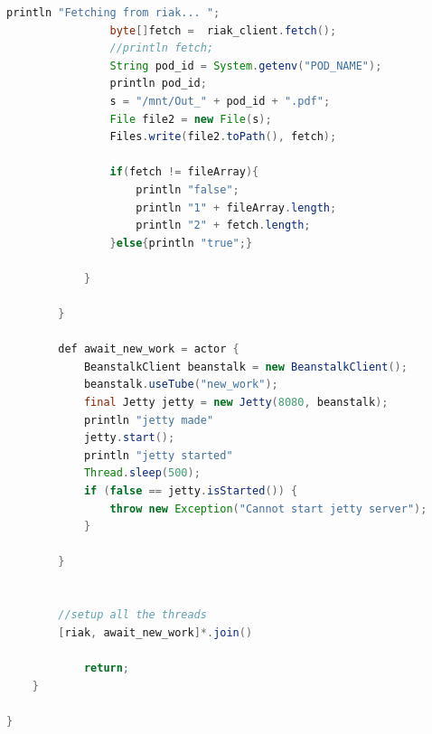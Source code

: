 \documentclass[onecolumn, draftclsnofoot,10pt, compsoc]{IEEEtran}
\begin{document}
\begin{appendices}
\begin{lstlisting}[language = java]
				println "Fetching from riak... ";
				byte[]fetch =  riak_client.fetch();
				//println fetch;
				String pod_id = System.getenv("POD_NAME");
				println pod_id;
				s = "/mnt/Out_" + pod_id + ".pdf";
				File file2 = new File(s);
				Files.write(file2.toPath(), fetch);

				if(fetch != fileArray){
					println "false";
					println "1" + fileArray.length;
					println "2" + fetch.length;
				}else{println "true";}
				
			}

		}

		def await_new_work = actor {
			BeanstalkClient beanstalk = new BeanstalkClient();		
			beanstalk.useTube("new_work");
			final Jetty jetty = new Jetty(8080, beanstalk);
			println "jetty made"
			jetty.start();
			println "jetty started"
			Thread.sleep(500);
			if (false == jetty.isStarted()) {
				throw new Exception("Cannot start jetty server");
			}

		}


		//setup all the threads
		[riak, await_new_work]*.join()

			return;
	}

}
\end{lstlisting}


\end{appendices}
\end{document}
